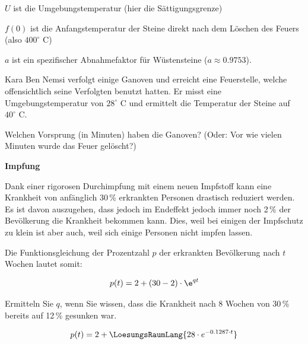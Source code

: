 $U$ ist die Umgebungstemperatur (hier die Sättigungsgrenze)

$f(0)$ ist die Anfangstemperatur der Steine direkt nach dem Löschen des Feuers (also $400^\circ$ C)

$a$ ist ein spezifischer Abnahmefaktor für Wüstensteine ($a\approx 0.9753$).


Kara Ben Nemsi verfolgt einige Ganoven und erreicht eine Feuerstelle, welche offensichtlich seine Verfolgten benutzt hatten. Er misst eine Umgebungstemperatur von $28^\circ$ C und ermittelt die Temperatur der Steine auf $40^\circ$ C.

Welchen Vorsprung (in Minuten) haben die Ganoven? (Oder: Vor wie vielen Minuten wurde das Feuer gelöscht?)


\platzFuerBerechnungenBisEndeSeite{}



\bbwActAufgabenNr{} \textbf{Impfung}
\nextBbwAufgabenNummer{}

Dank einer rigorosen Durchimpfung mit einem neuen Impfstoff kann eine Krankheit von anfänglich 30\,\% erkrankten Personen
drastisch reduziert werden. Es ist davon auszugehen, dass jedoch im
Endeffekt jedoch immer noch 2\,\% der Bevölkerung die Krankheit bekommen
kann. Dies, weil bei einigen der Impfschutz zu klein ist aber auch,
weil sich einige Personen nicht impfen lassen.

Die Funktionsgleichung der Prozentzahl $p$ der erkrankten Bevölkerung nach $t$ Wochen lautet somit:

$$p(t) = 2 + (30-2)\cdot \e^{qt}$$

Ermitteln Sie $q$, wenn Sie wissen, dass die Krankheit nach 8 Wochen von 30\,\% bereits auf 12\,\% gesunken war.

$$p(t) = 2 + \LoesungsRaumLang{28\cdot{}e^{-0.1287\cdot{}t}}$$


\platzFuerBerechnungenBisEndeSeite{}



